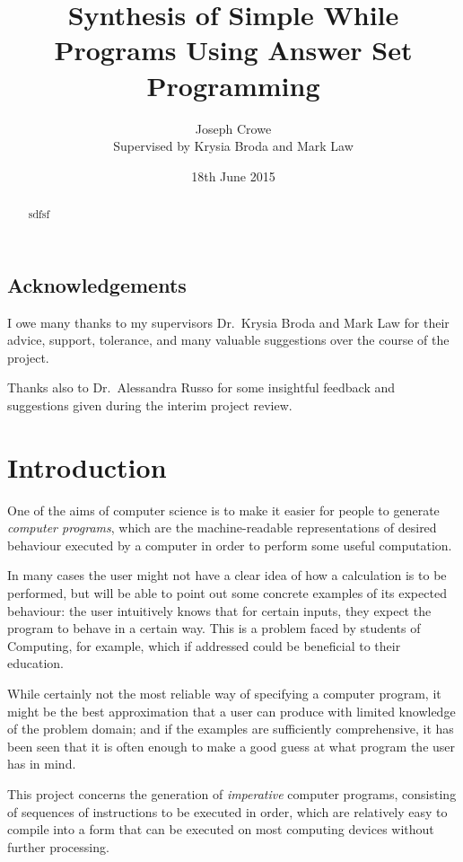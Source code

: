 \documentclass[a4paper,twoside,notitlepage]{report}
\begin{document}
\title{Synthesis of Simple While Programs Using Answer Set Programming}
\author{Joseph Crowe \\ Supervised by Krysia Broda and Mark Law}
\date{18th June 2015}
\maketitle

\begin{abstract}
sdfsf
\end{abstract}
\clearpage

\section*{Acknowledgements}
I owe many thanks to my supervisors Dr.\ Krysia Broda and Mark Law for their 
advice, support, tolerance, and many valuable suggestions over the course of 
the project.

Thanks also to Dr.\ Alessandra Russo for some insightful feedback and 
suggestions given during the interim project review.
\clearpage

\tableofcontents

\chapter{Introduction} \label{chp:intro}

One of the aims of computer science is to make it easier for people to 
generate \emph{computer programs}, which are the machine-readable 
representations of desired behaviour executed by a computer in order to 
perform some useful computation.

In many cases the user might not have a clear idea of how a calculation is 
to be performed, but will be able to point out some concrete examples of 
its expected behaviour: the user intuitively knows that for certain 
inputs, they expect the program to behave in a certain way. This is a 
problem faced by students of Computing, for example, which if addressed 
could be beneficial to their education.

While certainly not the most reliable way of specifying a computer 
program, it might be the best approximation that a user can produce with 
limited knowledge of the problem domain; and if the examples are 
sufficiently comprehensive, it has been seen that it is often enough to 
make a good guess at what program the user has in mind.

This project concerns the generation of \emph{imperative} computer 
programs, consisting of sequences of instructions to be executed in order, 
which are relatively easy to compile into a form that can be executed on 
most computing devices without further processing.
\end{document}

